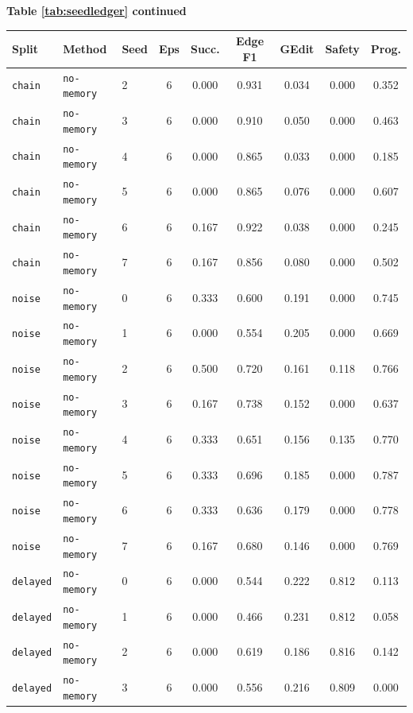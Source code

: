 \documentclass{article}
\begin{document}
\begin{center}
\textbf{Table \ref{tab:seedledger} continued}\\[0.4ex]
\begin{tabular}{lllcccccc}
\toprule
Split & Method & Seed & Eps & Succ. & Edge F1 & GEdit & Safety & Prog. \\
\midrule
\texttt{chain} & \texttt{no-memory} & 2 & 6 & 0.000 & 0.931 & 0.034 & 0.000 & 0.352 \\
\texttt{chain} & \texttt{no-memory} & 3 & 6 & 0.000 & 0.910 & 0.050 & 0.000 & 0.463 \\
\texttt{chain} & \texttt{no-memory} & 4 & 6 & 0.000 & 0.865 & 0.033 & 0.000 & 0.185 \\
\texttt{chain} & \texttt{no-memory} & 5 & 6 & 0.000 & 0.865 & 0.076 & 0.000 & 0.607 \\
\texttt{chain} & \texttt{no-memory} & 6 & 6 & 0.167 & 0.922 & 0.038 & 0.000 & 0.245 \\
\texttt{chain} & \texttt{no-memory} & 7 & 6 & 0.167 & 0.856 & 0.080 & 0.000 & 0.502 \\
\texttt{noise} & \texttt{no-memory} & 0 & 6 & 0.333 & 0.600 & 0.191 & 0.000 & 0.745 \\
\texttt{noise} & \texttt{no-memory} & 1 & 6 & 0.000 & 0.554 & 0.205 & 0.000 & 0.669 \\
\texttt{noise} & \texttt{no-memory} & 2 & 6 & 0.500 & 0.720 & 0.161 & 0.118 & 0.766 \\
\texttt{noise} & \texttt{no-memory} & 3 & 6 & 0.167 & 0.738 & 0.152 & 0.000 & 0.637 \\
\texttt{noise} & \texttt{no-memory} & 4 & 6 & 0.333 & 0.651 & 0.156 & 0.135 & 0.770 \\
\texttt{noise} & \texttt{no-memory} & 5 & 6 & 0.333 & 0.696 & 0.185 & 0.000 & 0.787 \\
\texttt{noise} & \texttt{no-memory} & 6 & 6 & 0.333 & 0.636 & 0.179 & 0.000 & 0.778 \\
\texttt{noise} & \texttt{no-memory} & 7 & 6 & 0.167 & 0.680 & 0.146 & 0.000 & 0.769 \\
\texttt{delayed} & \texttt{no-memory} & 0 & 6 & 0.000 & 0.544 & 0.222 & 0.812 & 0.113 \\
\texttt{delayed} & \texttt{no-memory} & 1 & 6 & 0.000 & 0.466 & 0.231 & 0.812 & 0.058 \\
\texttt{delayed} & \texttt{no-memory} & 2 & 6 & 0.000 & 0.619 & 0.186 & 0.816 & 0.142 \\
\texttt{delayed} & \texttt{no-memory} & 3 & 6 & 0.000 & 0.556 & 0.216 & 0.809 & 0.000 \\

\end{tabular}
\end{center}
\end{document}

